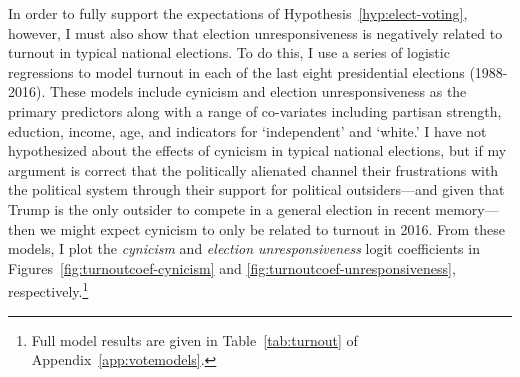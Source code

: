 \documentclass[12pt]{article}
\begin{document}
In order to fully support the expectations of Hypothesis~\ref{hyp:elect-voting}, however, I must also show that election unresponsiveness is negatively related to turnout in typical national elections. To do this, I use a series of logistic regressions to model turnout in each of the last eight presidential elections (1988-2016). These models include cynicism and election unresponsiveness as the primary predictors along with a range of co-variates including partisan strength, eduction, income, age, and indicators for `independent' and `white.' I have not hypothesized about the effects of cynicism in typical national elections, but if my argument is correct that the politically alienated channel their frustrations with the political system through their support for political outsiders---and given that Trump is the only outsider to compete in a general election in recent memory---then we might expect cynicism to only be related to turnout in 2016. From these models, I plot the \textit{cynicism} and \textit{election unresponsiveness} logit coefficients in Figures~\ref{fig:turnoutcoef-cynicism} and \ref{fig:turnoutcoef-unresponsiveness}, respectively.\footnote{Full model results are given in Table~\ref{tab:turnout} of Appendix~\ref{app:votemodels}.} 
 
\end{document}
